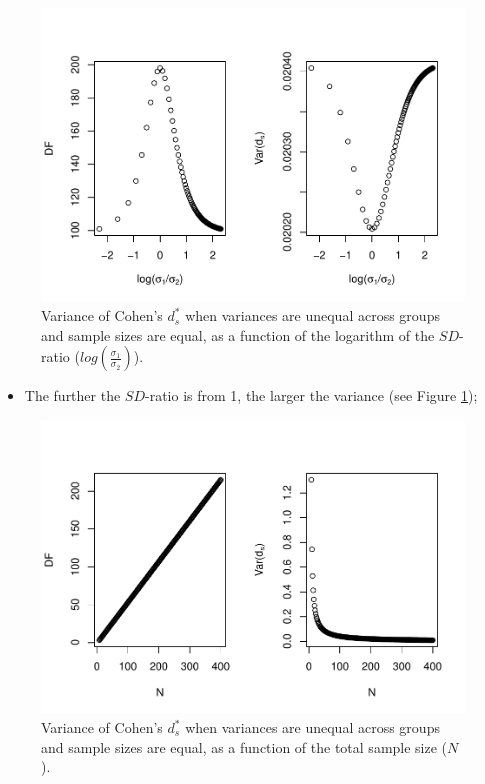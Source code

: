 \documentclass[
  english,
  man,mask]{apa6}
\providecommand{\tightlist}{%
  \setlength{\itemsep}{0pt}\setlength{\parskip}{0pt}}
\begin{document}
\begin{figure}
\centering
\includegraphics{Theoretical-Variance-of-all-estimators-as-a-function-of-population-parameters_files/figure-latex/varcohendprimehetbalSDratio2-1.pdf}
\caption{\label{fig:varcohendprimehetbalSDratio2}Variance of Cohen's \(d^*_s\) when variances are unequal across groups and sample sizes are equal, as a function of the logarithm of the \(SD\)-ratio (\(log \left( \frac{\sigma_1}{\sigma_2} \right)\)).}
\end{figure}

\begin{itemize}
\tightlist
\item
  The further the \(SD\)-ratio is from 1, the larger the variance (see Figure \ref{fig:varcohendprimehetbalSDratio2});
\end{itemize}

\begin{figure}
\centering
\includegraphics{Theoretical-Variance-of-all-estimators-as-a-function-of-population-parameters_files/figure-latex/varcohendprimehetbalNsize2-1.pdf}
\caption{\label{fig:varcohendprimehetbalNsize2}Variance of Cohen's \(d^*_s\) when variances are unequal across groups and sample sizes are equal, as a function of the total sample size (\(N\)).}
\end{figure}
\end{document}
